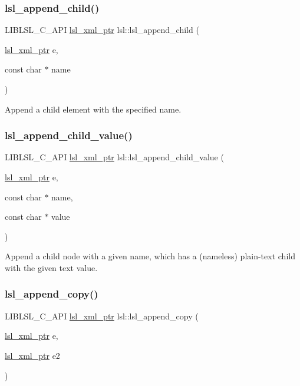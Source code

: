 \subsubsection{\texorpdfstring{lsl\+\_\+append\+\_\+child()}{lsl\_append\_child()}}
{\footnotesize\ttfamily L\+I\+B\+L\+S\+L\+\_\+\+C\+\_\+\+A\+PI \hyperlink{namespacelsl_a5edc7a49a1a1be1634fe6dce3d59c59b}{lsl\+\_\+xml\+\_\+ptr} lsl\+::lsl\+\_\+append\+\_\+child (\begin{DoxyParamCaption}\item[{\hyperlink{namespacelsl_a5edc7a49a1a1be1634fe6dce3d59c59b}{lsl\+\_\+xml\+\_\+ptr}}]{e,  }\item[{const char $\ast$}]{name }\end{DoxyParamCaption})}

Append a child element with the specified name. \mbox{\label{namespacelsl_a3d9fb84fd68c84dd8692e25f1461a894}} 
\subsubsection{\texorpdfstring{lsl\+\_\+append\+\_\+child\+\_\+value()}{lsl\_append\_child\_value()}}
{\footnotesize\ttfamily L\+I\+B\+L\+S\+L\+\_\+\+C\+\_\+\+A\+PI \hyperlink{namespacelsl_a5edc7a49a1a1be1634fe6dce3d59c59b}{lsl\+\_\+xml\+\_\+ptr} lsl\+::lsl\+\_\+append\+\_\+child\+\_\+value (\begin{DoxyParamCaption}\item[{\hyperlink{namespacelsl_a5edc7a49a1a1be1634fe6dce3d59c59b}{lsl\+\_\+xml\+\_\+ptr}}]{e,  }\item[{const char $\ast$}]{name,  }\item[{const char $\ast$}]{value }\end{DoxyParamCaption})}

Append a child node with a given name, which has a (nameless) plain-\/text child with the given text value. \mbox{\label{namespacelsl_a52061cbc108b95b34aa7d806d6115f91}} 
\subsubsection{\texorpdfstring{lsl\+\_\+append\+\_\+copy()}{lsl\_append\_copy()}}
{\footnotesize\ttfamily L\+I\+B\+L\+S\+L\+\_\+\+C\+\_\+\+A\+PI \hyperlink{namespacelsl_a5edc7a49a1a1be1634fe6dce3d59c59b}{lsl\+\_\+xml\+\_\+ptr} lsl\+::lsl\+\_\+append\+\_\+copy (\begin{DoxyParamCaption}\item[{\hyperlink{namespacelsl_a5edc7a49a1a1be1634fe6dce3d59c59b}{lsl\+\_\+xml\+\_\+ptr}}]{e,  }\item[{\hyperlink{namespacelsl_a5edc7a49a1a1be1634fe6dce3d59c59b}{lsl\+\_\+xml\+\_\+ptr}}]{e2 }\end{DoxyParamCaption})}

